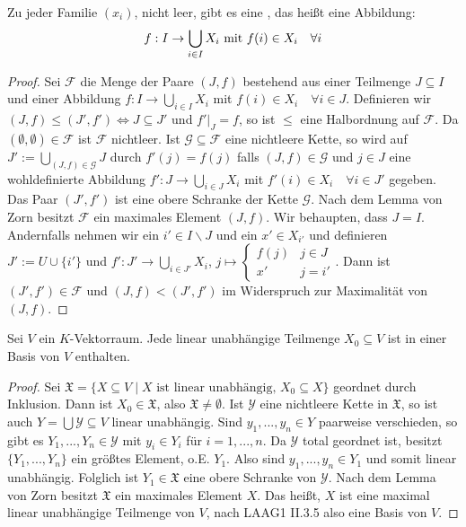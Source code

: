 \begin{conclusion}[Auswahlaxiom]
	Zu jeder Familie $(x_i)$, nicht leer, gibt es eine , das heißt eine Abbildung:
	\begin{align}
		f: I\to \bigcup_{i\in I} X_i\text{ mit } f(i)\in X_i\quad\forall i\notag
	\end{align}
\end{conclusion}
\begin{proof}
	Sei $\mathcal{F}$ die Menge der Paare $(J,f)$ bestehend aus einer Teilmenge $J\subseteq I$ und einer Abbildung $f:I\to \bigcup_{i\in I} X_i$ mit $f(i)\in X_i\quad\forall i\in J$. Definieren wir $(J,f)\le (J',f')\iff J\subseteq J'$ und $f'\vert_J = f$, so ist $\le$ eine Halbordnung auf $\mathcal{F}$. Da $(\emptyset,\emptyset)\in\mathcal{F}$ ist $\mathcal{F}$ nichtleer. Ist $\mathcal{G}\subseteq\mathcal{F}$ eine nichtleere Kette, so wird auf $J':=\bigcup_{(J,f)\in\mathcal{G}} J$ durch $f'(j)=f(j)$ falls $(J,f)\in\mathcal{G}$ und $j\in J$ eine wohldefinierte Abbildung $f':J\to \bigcup_{i\in J}X_i$ mit $f'(i)\in X_i\quad\forall i\in J'$ gegeben. Das Paar $(J',f')$ ist eine obere Schranke der Kette $\mathcal{G}$. Nach dem Lemma von Zorn besitzt $\mathcal{F}$ ein maximales Element $(J,f)$. Wir behaupten, dass $J=I$. Andernfalls nehmen wir ein $i'\in I\backslash J$ und ein $x'\in X_{i'}$ und definieren $J':= U\cup\{i'\}$ und $f':J'\to \bigcup_{i\in J'} X_i$, $j\mapsto\begin{cases}f(j)&j\in J\\ x'&j=i'\end{cases}$. Dann ist $(J',f')\in\mathcal{F}$ und $(J,f)<(J',f')$ im Widerspruch zur Maximalität von $(J,f)$.
\end{proof}


\begin{conclusion}[Basisergänzungssatz]
	Sei $V$ ein $K$-Vektorraum. Jede linear unabhängige Teilmenge $X_0\subseteq V$ ist in einer Basis von $V$ enthalten.
\end{conclusion}
\begin{proof}
	Sei $\mathfrak{X}=\{X\subseteq V\mid X\text{ ist linear unabhängig, } X_0\subseteq X\}$ geordnet durch Inklusion. Dann ist $X_0\in\mathfrak{X}$, also $\mathfrak{X}\neq\emptyset$. Ist $\mathcal{Y}$ eine nichtleere Kette in $\mathfrak{X}$, so ist auch $Y=\bigcup\mathcal{Y}\subseteq V$ linear unabhängig. Sind $y_1,...,y_n\in Y$ paarweise verschieden, so gibt es $Y_1,...,Y_n\in\mathcal{Y}$ mit $y_i\in Y_i$ für $i=1,...,n$. Da $\mathcal{Y}$ total geordnet ist, besitzt $\{Y_1,...,Y_n\}$ ein größtes Element, o.E. $Y_1$. Also sind $y_1,...,y_n\in Y_1$ und somit linear unabhängig. Folglich ist $Y_1\in \mathfrak{X}$ eine obere Schranke von $\mathcal{Y}$. Nach dem Lemma von Zorn besitzt $\mathfrak{X}$ ein maximales Element $X$. Das heißt, $X$ ist eine maximal linear unabhängige Teilmenge von $V$, nach LAAG1 II.3.5 also eine Basis von $V$. %
	\end{proof}
